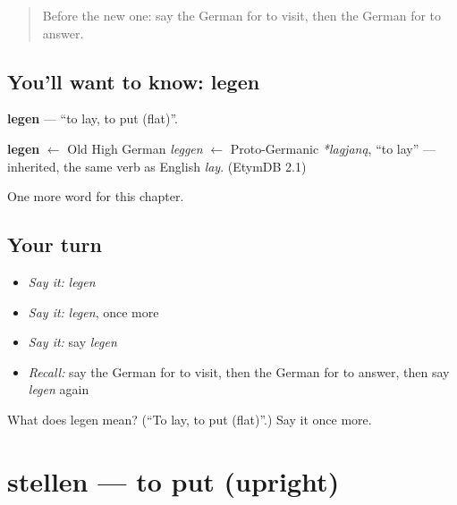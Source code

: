 \label{lesson:GE-C139-legen}



\begin{quote}
Before the new one: say the German for to visit, then the German for to answer.
\end{quote}

\subsection*{You'll want to know: legen}
\textbf{legen} — \textquotedblleft{}to lay, to put (flat)\textquotedblright{}.

\begin{cousinweb}
\textbf{legen} $\leftarrow$ Old High German \emph{leggen} $\leftarrow$ Proto-Germanic \emph{*lagjaną}, \textquotedblleft{}to lay\textquotedblright{} — inherited, the same verb as English \emph{lay}. (EtymDB 2.1)
\end{cousinweb}

\begin{grammarlens}[title={What you've built}]
One more word for this chapter.
\end{grammarlens}

\subsection*{Your turn}
\begin{itemize}
\raggedright
  \item \emph{Say it:} \emph{legen}
  \item \emph{Say it:} \emph{legen}, once more
  \item \emph{Say it:} say \emph{legen}
  \item \emph{Recall:} say the German for to visit, then the German for to answer, then say \emph{legen} again
\end{itemize}

\begin{tcolorbox}[breakable,colback=teal!4,colframe=teal!35!black,title={Before you move on}]
What does legen mean? (\textquotedblleft{}To lay, to put (flat)\textquotedblright{}.) Say it once more.
\end{tcolorbox}
\section[stellen]{stellen — to put (upright)}

\label{lesson:GE-C139-stellen}



